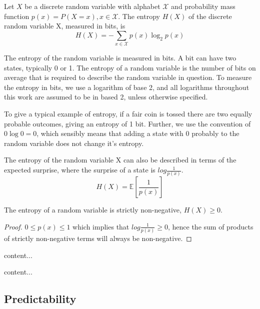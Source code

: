 \begin{definition}
	Let $X$ be a discrete random variable with alphabet $\mathcal{X}$ and probability mass function $p(x) = P(X = x), x \in \mathcal{X}$.
	The entropy $H(X)$ of the discrete random variable X, measured in bits, is 
	\begin{equation}\label{eq:shannon}
	H(X)=-\sum_{x \in \mathcal{X}} p(x) \log_2 p(x)
	\end{equation}
\end{definition} 

The entropy of the random variable is measured in bits. A bit can have two states, typically 0 or 1. The entropy of a random variable is the number of bits on average that is required to describe the random variable in question. To measure the entropy in bits, we use a logarithm of base 2, and all logarithms throughout this work are assumed to be in based 2, unless otherwise specified.

To give a typical example of entropy, if a fair coin is tossed there are two equally probable outcomes, giving an entropy of 1 bit. Further, we use the convention of $0\log 0 = 0$, which sensibly means that adding a state with 0 probably to the random variable does not change it's entropy.

\begin{remark}[Suprise]
	The entropy of the random variable X can also be described in terms of the expected surprise, where the surprise of a state is $log \frac{1}{p(x)}$.
	\begin{equation}
		H(X) = \mathbb{E} \left[ \frac{1}{p(x)} \right]
	\end{equation}
\end{remark}	





\begin{lemma}
	The entropy of a random variable is strictly non-negative, $H(X) \geq 0$.
\end{lemma}

\begin{proof}
	$0 \leq p(x) \leq 1$ which implies that $log \frac{1}{p(x)} \geq 0$,
	hence the sum of products of strictly non-negative terms will always be non-negative. 
\end{proof}


\begin{definition}
	content...
\end{definition}




\begin{definition}
	content...
\end{definition}



\subsection{Predictability}
